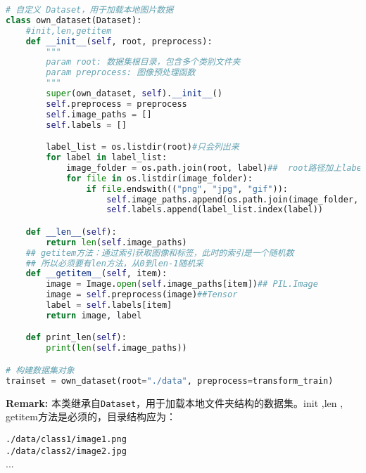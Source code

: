 \documentclass{article}
\begin{document}
    
\begin{lstlisting}[language=Python]
# 自定义 Dataset，用于加载本地图片数据
class own_dataset(Dataset):
    #init,len,getitem
    def __init__(self, root, preprocess):
        """
        param root: 数据集根目录，包含多个类别文件夹
        param preprocess: 图像预处理函数
        """
        super(own_dataset, self).__init__()
        self.preprocess = preprocess
        self.image_paths = []
        self.labels = []

        label_list = os.listdir(root)#只会列出来
        for label in label_list:
            image_folder = os.path.join(root, label)##  root路径加上label
            for file in os.listdir(image_folder):
                if file.endswith(("png", "jpg", "gif")):
                    self.image_paths.append(os.path.join(image_folder, file))
                    self.labels.append(label_list.index(label))

    def __len__(self):
        return len(self.image_paths)
    ## getitem方法：通过索引获取图像和标签，此时的索引是一个随机数
    ## 所以必须要有len方法，从0到len-1随机采
    def __getitem__(self, item):
        image = Image.open(self.image_paths[item])## PIL.Image 
        image = self.preprocess(image)##Tensor
        label = self.labels[item]
        return image, label

    def print_len(self):
        print(len(self.image_paths))

# 构建数据集对象
trainset = own_dataset(root="./data", preprocess=transform_train)
\end{lstlisting}

\textbf{Remark:} 本类继承自\texttt{Dataset}，用于加载本地文件夹结构的数据集。init ,len , getitem方法是必须的，目录结构应为：

\vspace{0.5em}
\texttt{./data/class1/image1.png} \\
\texttt{./data/class2/image2.jpg} \\
...
\end{document}
